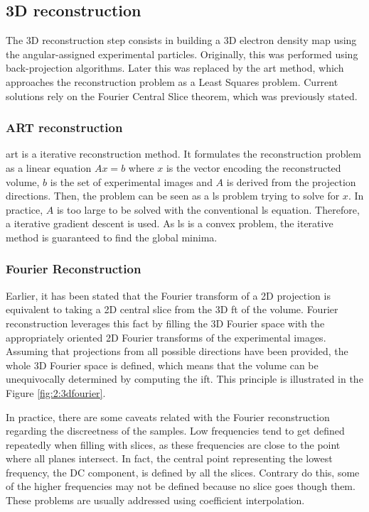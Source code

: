 \documentclass[../main.tex]{subfiles}
\begin{document}
\subsection{3D reconstruction}
The 3D reconstruction step consists in building a 3D electron density map using the angular-assigned experimental particles. Originally, this was performed using back-projection algorithms. Later this was replaced by the \gls{art} method, which approaches the reconstruction problem as a Least Squares problem. Current solutions rely on the Fourier Central Slice theorem, which was previously stated.

\subsubsection{ART reconstruction}
\Gls{art} is a iterative reconstruction method. It formulates the reconstruction problem as a linear equation $Ax = b$ where $x$ is the vector encoding the reconstructed volume, $b$ is the set of experimental images and $A$ is derived from the projection directions. Then, the problem can be seen as a \gls{ls} problem\cite{kak2001} trying to solve for $x$. In practice, $A$ is too large to be solved with the conventional \gls{ls} equation. Therefore, a iterative gradient descent is used. As \gls{ls} is a convex problem, the iterative method is guaranteed to find the global minima\cite{nikazad2008}\cite{sorzano2017b}.

\subsubsection{Fourier Reconstruction}
Earlier, it has been stated that the Fourier transform of a 2D projection is equivalent to taking a 2D central slice from the 3D \gls{ft} of the volume. Fourier reconstruction leverages this fact by filling the 3D Fourier space with the appropriately oriented 2D Fourier transforms of the experimental images. Assuming that projections from all possible directions have been provided, the whole 3D Fourier space is defined, which means that the volume can be unequivocally determined by computing the \gls{ift}. This principle is illustrated in the Figure \ref{fig:2:3dfourier}\cite{sorzano2017b}.

In practice, there are some caveats related with the Fourier reconstruction regarding the discreetness of the samples. Low frequencies tend to get defined repeatedly when filling with slices, as these frequencies are close to the point where all planes intersect. In fact, the central point representing the lowest frequency, the DC component, is defined by all the slices. Contrary do this, some of the higher frequencies may not be defined because no slice goes though them. These problems are usually addressed using coefficient interpolation.
\end{document}

